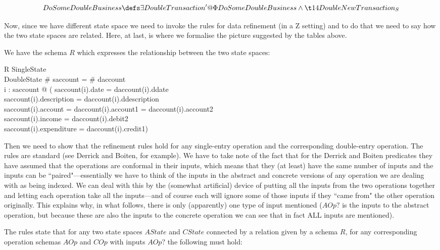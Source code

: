 \documentclass[11pt]{amsart}
\begin{document}
\[
DoSomeDoubleBusiness \defs \exists DoubleTransaction' @ \Phi DoSomeDoubleBusiness \land\\
\t14 DoubleNewTransaction_S
\]

Now, since we have different state space we need to invoke the rules for data refinement (in a Z setting) and to do that we need to say how the two state spaces are related. Here, at last, is where we formalise the picture suggested by the tables above.

We have the schema $R$ which expresses the relationship between the two state spaces:

\begin{schema}{R}
SingleState\\
DoubleState
\where
\# saccount = \# daccount\\
\forall i : \dom saccount @ (
saccount(i).date = daccount(i).ddate \land\\
saccount(i).description = daccount(i).ddescription \land\\
saccount(i).account = daccount(i).account1 = daccount(i).account2 \land\\
saccount(i).income = daccount(i).debit2 \land\\
saccount(i).expenditure = daccount(i).credit1)
\end{schema}

Then we need to show that the refinement rules hold for any single-entry operation and the  corresponding double-entry operation. The rules are standard (see Derrick and Boiten, for example). We have to take note of the fact that for the Derrick and Boiten predicates they have assumed that the operations are conformal in their inputs, which means that they (at least) have the same number of inputs and the inputs can be ``paired"---essentially we have to think of the inputs in the abstract and concrete versions of any operation we are dealing with as being indexed. We can deal with this by the (somewhat artificial) device of putting all the inputs from the two operations together and letting each operation take all the inputs---and of course each will ignore some of those inputs if they ``came from" the other operation originally. This explains why, in what follows, there is only (apparently) one type of input mentioned ($AOp?$ is the inputs to the abstract operation, but because these are also the inputs to the concrete operation we can see that in fact ALL inputs are mentioned).

The rules state that for any two state spaces $AState$ and $CState$ connected by a relation given by a schema $R$, for any corresponding operation schemas $AOp$ and $COp$ with inputs $AOp?$ the following must hold:\\
\end{document}
